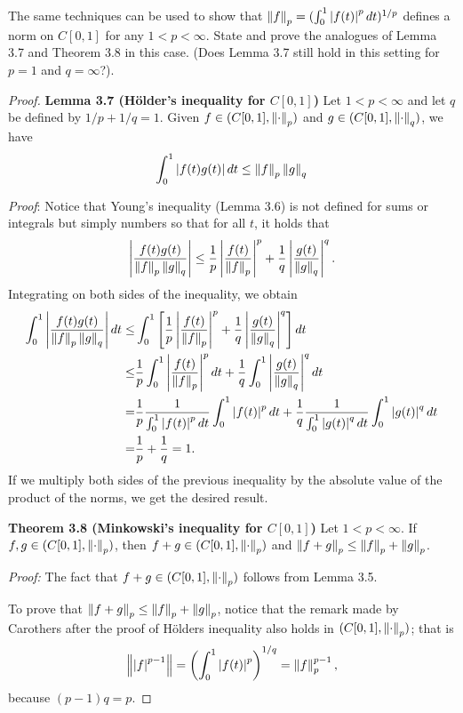 \begin{exercise}{25}
The same techniques can be used to show that $\left\lVert f\right\rVert_p=(\int_0^1\left\lvert f(t)\right\rvert^pdt)^{1/p}$ defines a norm on $C[0,1]$ for any $1<p<\infty$. State and prove the analogues of Lemma 3.7 and Theorem 3.8 in this case. (Does Lemma 3.7 still hold in this setting for $p=1$ and $q=\infty$?).
\end{exercise}
\begin{proof}
\textbf{Lemma 3.7 (H\"older's inequality for $C[0,1]$)} Let $1<p<\infty$ and let $q$ be defined by $1/p+1/q=1$. Given $f\in (C[0,1],\left\lVert \cdot\right\rVert_p)$ and $g\in (C[0,1],\left\lVert \cdot\right\rVert_q)$, we have
\[
\int_0^1\left\lvert f(t)g(t)\right\rvert dt
\leq \left\lVert f\right\rVert_p\left\lVert g\right\rVert_q
\]

\textit{Proof}: Notice that Young's inequality (Lemma 3.6) is not defined for sums or integrals but simply numbers so that for all $t$, it holds that 
\[
\left\lvert \frac{f(t)g(t)}{\left\lVert f\right\rVert_p\left\lVert g\right\rVert_q}\right\rvert
\leq \frac{1}{p}\left\lvert \frac{f(t)}{\left\lVert f\right\rVert_p}\right\rvert^p 
+\frac{1}{q}\left\lvert \frac{g(t)}{\left\lVert g\right\rVert_q}\right\rvert^q.
\]
Integrating on both sides of the inequality, we obtain
\begin{align*}
    \int_0^1 \left\lvert \frac{f(t)g(t)}{\left\lVert f\right\rVert_p\left\lVert g\right\rVert_q}\right\rvert dt 
    \leq& \int_0^1\left[\frac{1}{p}\left\lvert \frac{f(t)}{\left\lVert f\right\rVert_p}\right\rvert^p +\frac{1}{q}\left\lvert \frac{g(t)}{\left\lVert g\right\rVert_q}\right\rvert^q\right]dt\\
    \leq& \frac{1}{p}\int_0^1\left\lvert \frac{f(t)}{\left\lVert f\right\rVert_p}\right\rvert^p dt
    + \frac{1}{q}\int_0^1\left\lvert \frac{g(t)}{\left\lVert g\right\rVert_q}\right\rvert^q dt\\
    =& \frac{1}{p}\frac{1}{\int_0^1 \left\lvert f(t)\right\rvert^p dt}\int_0^1\left\lvert f(t)\right\rvert^p dt
    + \frac{1}{q}\frac{1}{\int_0^1\left\lvert g(t)\right\rvert^q dt}\int_0^1\left\lvert g(t)\right\rvert^q dt\\
    =& \frac{1}{p} + \frac{1}{q} =1.
\end{align*}
If we multiply both sides of the previous inequality by the absolute value of the product of the norms, we get the desired result.
    

\textbf{Theorem 3.8 (Minkowski's inequality for $C[0,1]$)} Let $1<p<\infty$. If $f,g\in (C[0,1],\left\lVert \cdot\right\rVert_p)$, then $f+g\in (C[0,1],\left\lVert \cdot\right\rVert_p)$ and $\left\lVert f+g\right\rVert_p \leq\left\lVert f\right\rVert_p+\left\lVert g\right\rVert_p$.

\textit{Proof:} The fact that $f+g\in (C[0,1],\left\lVert \cdot\right\rVert_p)$ follows from Lemma 3.5. 

To prove that $\left\lVert f+g\right\rVert_p \leq\left\lVert f\right\rVert_p+\left\lVert g\right\rVert_p$, notice that the remark made by Carothers after the proof of H\"olders inequality also holds in $(C[0,1],\left\lVert \cdot\right\rVert_p)$; that is 
\[
    \left\lVert \left\lvert f\right\rvert^{p-1}\right\rVert
    = \left(\int_0^1\left\lvert f(t)\right\rvert^p\right)^{1/q}
    =\left\lVert f\right\rVert^{p-1}_p,
\]
because $(p-1)q=p$.


\end{proof}
